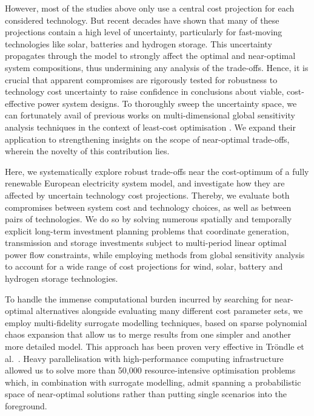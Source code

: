 However, most of the studies above only use a central cost projection for each
considered technology. But recent decades have shown that many of these
projections contain a high level of uncertainty, particularly for fast-moving
technologies like solar, batteries and hydrogen storage. This uncertainty
propagates through the model to strongly affect the optimal and near-optimal
system compositions, thus undermining any analysis of the trade-offs. Hence, it
is crucial that apparent compromises are rigorously tested for robustness to
technology cost uncertainty to raise confidence in conclusions about viable,
cost-effective power system designs. To thoroughly sweep the uncertainty space,
we can fortunately avail of previous works on multi-dimensional global
sensitivity analysis techniques in the context of least-cost optimisation
\cite{trondle_trade-offs_2020, mavromatidis_uncertainty_2018,
pizarro-alonso_uncertainties_2019, fais_impact_2016, usher_value_2015}. We
expand their application to strengthening insights on the scope of near-optimal
trade-offs, wherein the novelty of this contribution lies.


Here, we systematically explore robust trade-offs near the cost-optimum of a
fully renewable European electricity system model, and investigate how they are
affected by uncertain technology cost projections. Thereby, we evaluate both
compromises between system cost and technology choices, as well as between pairs
of technologies. We do so by solving numerous spatially and temporally explicit
long-term investment planning problems that coordinate generation, transmission
and storage investments subject to multi-period linear optimal power flow
constraints, while employing methods from global sensitivity analysis to account
for a wide range of cost projections for wind, solar, battery and hydrogen
storage technologies.


To handle the immense computational burden incurred by searching for
near-optimal alternatives alongside evaluating many different cost parameter
sets, we employ multi-fidelity surrogate modelling techniques, based on sparse
polynomial chaos expansion that allow us to merge results from one simpler and
another more detailed model. This approach has been proven very effective in
Tröndle et al.~\cite{trondle_trade-offs_2020}. Heavy parallelisation with
high-performance computing infrastructure allowed us to solve more than 50,000
resource-intensive optimisation problems which, in combination with surrogate
modelling, admit spanning a probabilistic space of near-optimal solutions rather
than putting single scenarios into the foreground.

